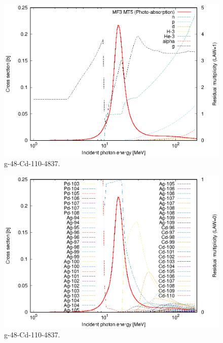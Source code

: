\begin{figure}
 \includegraphics[width=\linewidth]{eps/g_48-Cd-110_4837.eps}
  \caption{g-48-Cd-110-4837.}
\end{figure}
\begin{figure}
 \includegraphics[width=\linewidth]{eps-law0/g_48-Cd-110_4837.eps}
 \caption{g-48-Cd-110-4837.}
\end{figure}
\newpage \clearpage

